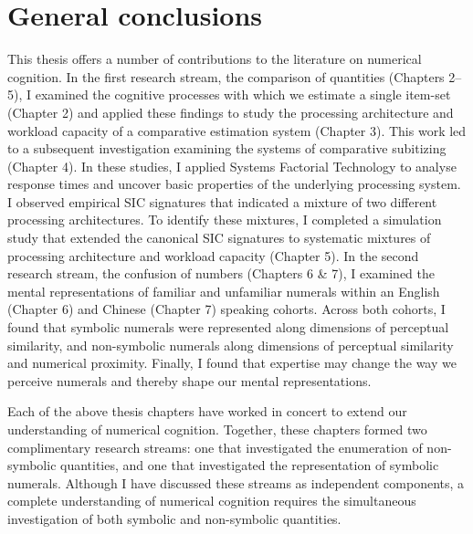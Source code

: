 \chapter{General conclusions} 

\label{Chapter 8}


This thesis offers a number of contributions to the literature on numerical cognition. In the first research stream, the comparison of quantities (Chapters 2--5), I examined the cognitive processes with which we estimate a single item-set (Chapter 2) and applied these findings to study the processing architecture and workload capacity of a comparative estimation system (Chapter 3). This work led to a subsequent investigation examining the systems of comparative subitizing (Chapter 4). In these studies, I applied Systems Factorial Technology to analyse response times and uncover basic properties of the underlying processing system. I observed empirical SIC signatures that indicated a mixture of two different processing architectures. To identify these mixtures, I completed a simulation study that extended the canonical SIC signatures to systematic mixtures of processing architecture and workload capacity (Chapter 5). In the second research stream, the confusion of numbers (Chapters 6 \& 7), I examined the mental representations of familiar and unfamiliar numerals within an English (Chapter 6) and Chinese (Chapter 7) speaking cohorts. Across both cohorts, I found that symbolic numerals were represented along dimensions of perceptual similarity, and non-symbolic numerals along dimensions of perceptual similarity and numerical proximity. Finally, I found that expertise may change the way we perceive numerals and thereby shape our mental representations. 

Each of the above thesis chapters have worked in concert to extend our understanding of numerical cognition. Together, these chapters formed two complimentary research streams: one that investigated the enumeration of non-symbolic quantities, and one that investigated the representation of symbolic numerals. Although I have discussed these streams as independent components, a complete understanding of numerical cognition requires the simultaneous investigation of both symbolic and non-symbolic quantities.

